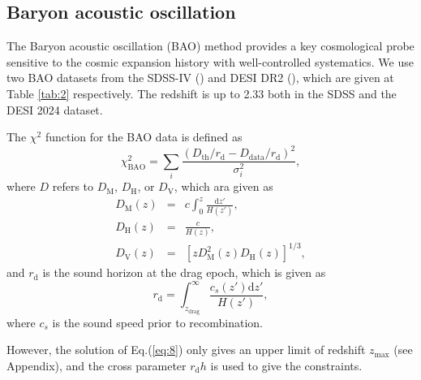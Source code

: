 \documentclass[twocolumn]{aastex631}
\begin{document}
\subsection{Baryon acoustic oscillation}

   The Baryon acoustic oscillation (BAO) method provides a key cosmological probe
   sensitive to the cosmic expansion history with well-controlled systematics.
   We use two BAO datasets from the SDSS-IV (\cite{PhysRevD.103.083533}) and 
   DESI DR2 (\cite{desicollaboration2025desidr2resultsii}),
   which are given at Table \ref{tab:2} respectively.
   The redshift is up to 2.33 both in the SDSS and the DESI 2024 dataset.

   The $\chi^2$ function for the BAO data is defined as
   \begin{equation}
      \chi_{\text{BAO}}^2=\sum_i\frac{(D_{\text{th}}/r_{\text{d}}-D_{\text{data}}/r_{\text{d}})^2}{\sigma_i^2},
      \label{eq:18}
   \end{equation}
   where $D$ refers to $D_{\text{M}}$, $D_{\text{H}}$, or $D_{\text{V}}$, which ara given as
   \begin{eqnarray}
      D_{\text{M}}(z)&=&c\int_0^z\frac{\text{d}z'}{H(z')},\\
      D_{\text{H}}(z)&=&\frac{c}{H(z)},\\
      D_{\text{V}}(z)&=&\left[zD_{\text{M}}^2(z)D_{\text{H}}(z)\right]^{1/3},
      \label{eq:19-21}
   \end{eqnarray}
   and $r_{\text{d}}$ is the sound horizon at the drag epoch, which is given as
   \begin{equation}
      r_{\text{d}}=\int_{z_{\text{drag}}}^{\infty}\frac{c_s(z')\text{d}z'}{H(z')},
      \label{eq:22}
   \end{equation}
   where $c_s$ is the sound speed prior to recombination.

   However, the solution of Eq.(\ref{eq:8}) only gives an upper 
   limit of redshift $z_{\max}$ (see Appendix), and the cross 
   parameter $r_{\text{d}}h$ is used to give the constraints.
\end{document}
